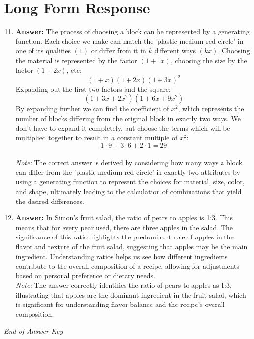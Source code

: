 \documentclass[12pt]{article}
\begin{document}
\section*{Long Form Response}
\begin{enumerate}[label=\arabic*.]
\setcounter{enumi}{10}
\item \textbf{Answer:} The process of choosing a block can be represented by a generating function. Each choice we make can match the 'plastic medium red circle' in one of its qualities $(1)$ or differ from it in $k$ different ways $(kx)$. Choosing the material is represented by the factor $(1+1 x)$, choosing the size by the factor $(1+2 x)$, etc:\[(1+x)(1+2 x)(1+3 x)^2\]Expanding out the first two factors and the square:\[(1+3 x+2 x^2)(1+6 x+9 x^2)\]By expanding further we can find the coefficient of $x^2$, which represents the number of blocks differing from the original block in exactly two ways. We don't have to expand it completely, but choose the terms which will be multiplied together to result in a constant multiple of $x^2$:\[1\cdot 9+3\cdot 6+2\cdot 1=\boxed{29}\]
\\ \textit{Note:} The correct answer is derived by considering how many ways a block can differ from the 'plastic medium red circle' in exactly two attributes by using a generating function to represent the choices for material, size, color, and shape, ultimately leading to the calculation of combinations that yield the desired differences.
\item \textbf{Answer:} In Simon's fruit salad, the ratio of pears to apples is 1:3. This means that for every pear used, there are three apples in the salad. The significance of this ratio highlights the predominant role of apples in the flavor and texture of the fruit salad, suggesting that apples may be the main ingredient. Understanding ratios helps us see how different ingredients contribute to the overall composition of a recipe, allowing for adjustments based on personal preference or dietary needs.
\\ \textit{Note:} The answer correctly identifies the ratio of pears to apples as 1:3, illustrating that apples are the dominant ingredient in the fruit salad, which is significant for understanding flavor balance and the recipe's overall composition.
\end{enumerate}

\vfill
\noindent\textit{End of Answer Key}
\end{document}
